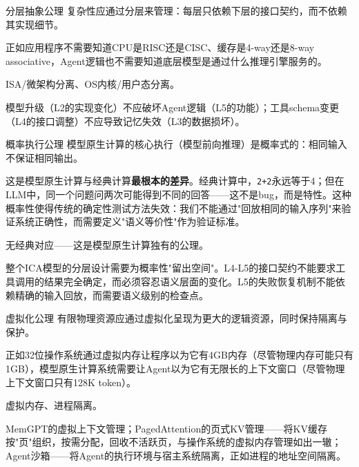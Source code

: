 \begin{axiombox}{\theaxiom\enspace 分层抽象公理}
复杂性应通过分层来管理：每层只依赖下层的接口契约，而不依赖其实现细节。
\end{axiombox}
\begin{description}[style=nextline,leftmargin=2em,font=\bfseries]
\item[直观解释] 正如应用程序不需要知道CPU是RISC还是CISC、缓存是4-way还是8-way associative，Agent逻辑也不需要知道底层模型是通过什么推理引擎服务的。
\item[经典来源] ISA/微架构分离、OS内核/用户态分离\cite{hennessy2017quantitative,ostep_2023}。
\item[ICA体现] 模型升级（L2的实现变化）不应破坏Agent逻辑（L5的功能）；工具schema变更（L4的接口调整）不应导致记忆失效（L3的数据损坏）。
\end{description}

\begin{axiombox}{\theaxiom\enspace 概率执行公理}
模型原生计算的核心执行（模型前向推理）是概率式的：相同输入不保证相同输出。
\end{axiombox}
\begin{description}[style=nextline,leftmargin=2em,font=\bfseries]
\item[直观解释] 这是模型原生计算与经典计算\textbf{最根本的差异}。经典计算中，\texttt{2+2}永远等于4；但在LLM中，同一个问题问两次可能得到不同的回答——这不是bug，而是特性。这种概率性使得传统的确定性测试方法失效：我们不能通过"回放相同的输入序列"来验证系统正确性，而需要定义"语义等价性"作为验证标准。
\item[经典来源] 无经典对应——这是模型原生计算独有的公理。
\item[ICA体现] 整个ICA模型的分层设计需要为概率性"留出空间"。L4-L5的接口契约不能要求工具调用的结果完全确定，而必须容忍语义层面的变化。L5的失败恢复机制不能依赖精确的输入回放，而需要语义级别的检查点。
\end{description}

\begin{axiombox}{\theaxiom\enspace 虚拟化公理}
有限物理资源应通过虚拟化呈现为更大的逻辑资源，同时保持隔离与保护。
\end{axiombox}
\begin{description}[style=nextline,leftmargin=2em,font=\bfseries]
\item[直观解释] 正如32位操作系统通过虚拟内存让程序以为它有4GB内存（尽管物理内存可能只有1GB），模型原生计算系统需要让Agent以为它有无限长的上下文窗口（尽管物理上下文窗口只有128K token）。
\item[经典来源] 虚拟内存、进程隔离\cite{ostep_2023}。
\item[ICA体现] MemGPT的虚拟上下文管理\cite{memgpt2023}；PagedAttention的页式KV管理\cite{kwon2023pagedattention}——将KV缓存按"页"组织，按需分配，回收不活跃页，与操作系统的虚拟内存管理如出一辙；Agent沙箱\cite{openai_codex_sandbox_2026}——将Agent的执行环境与宿主系统隔离，正如进程的地址空间隔离。
\end{description}

